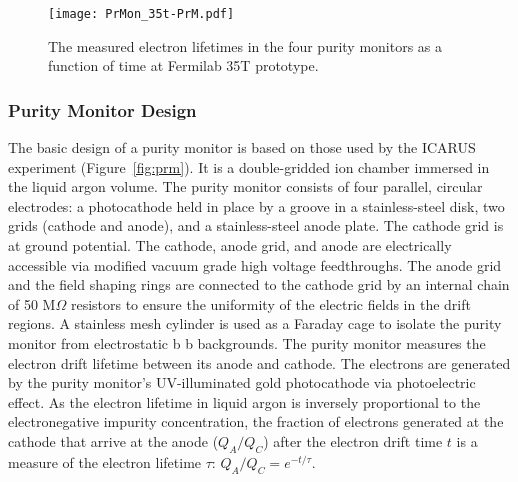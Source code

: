 \begin{figure}[t!]
\begin{center}
\texttt{[image: PrMon\_35t-PrM.pdf]}
\caption{The measured electron lifetimes in the four purity monitors as a function of time at Fermilab 35T prototype.} \label{fig-35t-prm}
\end{center}
\end{figure}


\subsubsection{Purity Monitor Design}


The basic design of a purity monitor is based on those used by the ICARUS experiment (Figure~\ref{fig:prm}). It is a double-gridded ion chamber immersed in the liquid argon volume. 
The purity monitor consists of four parallel, circular electrodes: a photocathode held in place by a groove in a stainless-steel disk, two grids (cathode and anode), and a stainless-steel anode plate. 
The cathode grid is at ground potential. The cathode, anode grid, and anode are electrically accessible via modified vacuum grade high voltage feedthroughs. 
The anode grid and the field shaping rings are connected to the cathode grid by an internal chain of 50 M$\Omega$ resistors to ensure the uniformity of the electric fields in the drift regions. 
A stainless mesh cylinder is used as a Faraday cage to isolate the purity monitor from electrostatic b b backgrounds. The purity monitor measures the electron drift lifetime between its anode and cathode. The electrons are generated by the purity monitor's UV-illuminated gold photocathode via photoelectric effect. As the electron lifetime in liquid argon is inversely proportional to the electronegative impurity concentration, the fraction of electrons generated at the cathode that arrive at the anode ($Q_A/Q_C$) after the electron drift time $t$ is a measure of the electron lifetime $\tau$: $Q_A/Q_C=e^{-t/\tau}$.

